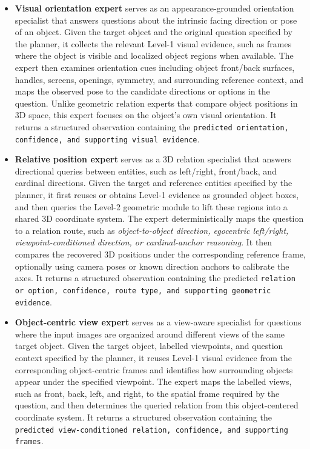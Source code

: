 \documentclass{llmxive}
\begin{document}
\begin{itemize}
\item \textbf{Visual orientation expert} serves as an appearance-grounded orientation specialist that answers questions about the intrinsic facing direction or pose of an object.
%
Given the target object and the original question specified by the planner, it collects the relevant Level-1 visual evidence, such as frames where the object is visible and localized object regions when available.
The expert then examines orientation cues including object front/back surfaces, handles, screens, openings, symmetry, and surrounding reference context, and maps the observed pose to the candidate directions or options in the question.
Unlike geometric relation experts that compare object positions in 3D space, this expert focuses on the object's own visual orientation.
It returns a structured observation containing the \texttt{predicted orientation, confidence, and supporting visual evidence}.

\item \textbf{Relative position expert} serves as a 3D relation specialist that answers directional queries between entities, such as left/right, front/back, and cardinal directions.
%
Given the target and reference entities specified by the planner, it first reuses or obtains Level-1 evidence as grounded object boxes, and then queries the Level-2 geometric module to lift these regions into a shared 3D coordinate system.
The expert deterministically maps the question to a relation route, such as \textit{object-to-object direction, egocentric left/right, viewpoint-conditioned direction, or cardinal-anchor reasoning}.
It then compares the recovered 3D positions under the corresponding reference frame, optionally using camera poses or known direction anchors to calibrate the axes.
It returns a structured observation containing the predicted \texttt{relation or option, confidence, route type, and supporting geometric evidence}.

\item \textbf{Object-centric view expert} serves as a view-aware specialist for questions where the input images are organized around different views of the same target object.
%
Given the target object, labelled viewpoints, and question context specified by the planner, it reuses Level-1 visual evidence from the corresponding object-centric frames and identifies how surrounding objects appear under the specified viewpoint.
The expert maps the labelled views, such as front, back, left, and right, to the spatial frame required by the question, and then determines the queried relation from this object-centered coordinate system.
It returns a structured observation containing the \texttt{predicted view-conditioned relation, confidence, and supporting frames}.
\end{itemize}
\end{document}
